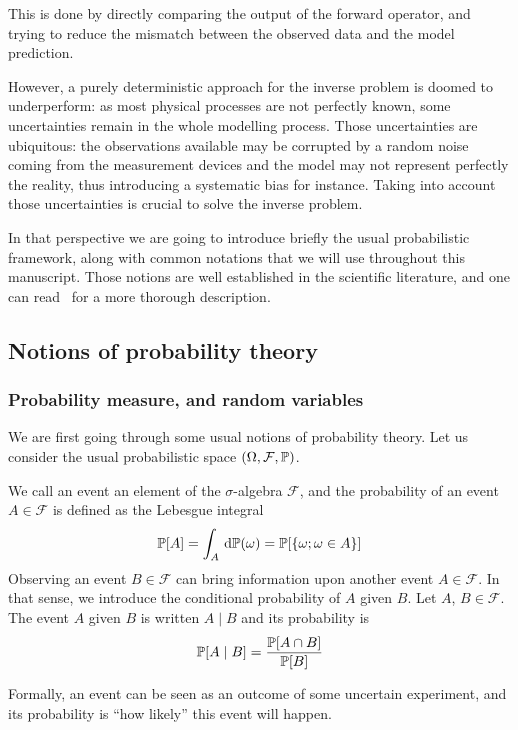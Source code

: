 \documentclass[../../Main_ManuscritThese.tex]{subfiles}
\begin{document}
This is done by directly comparing the output of the forward operator, and trying to reduce the mismatch between the observed data and the model prediction.



However, a purely deterministic approach for the inverse problem is doomed to underperform: as most physical processes are not perfectly known, some uncertainties remain in the whole modelling process. Those uncertainties are ubiquitous: the observations available may be corrupted by a random noise coming from the measurement devices and the model may not represent perfectly the reality, thus introducing a systematic bias for instance. Taking into account those uncertainties is crucial to solve the inverse problem.



In that perspective we are going to introduce briefly the usual probabilistic framework, along with common notations that we will use throughout this manuscript. Those notions are well established in the scientific literature, and one can read~\cite{billingsley_probability_2008} for a more thorough description.




\subsection{Notions of probability theory}
\subsubsection{Probability measure, and random variables}
\label{sec:notion_prob_theory}

We are first going through some usual notions of probability theory. 
Let us consider the usual probabilistic space $(\Omega, \mathcal{F}, \mathbb{P})$.
\begin{definition}
  \label{def:prob_event}
   We call an event an element of the $\sigma$-algebra $\mathcal{F}$, and the probability of an event $A\in \mathcal{F}$ is defined as the Lebesgue integral
  \begin{equation}
    \mathbb{P}[A] = \int_{A} \,\mathrm{d}\mathbb{P}(\omega) = \mathbb{P}[\{\omega ; \omega \in A\}]
  \end{equation}
Observing an event $B \in \mathcal{F}$ can bring information upon another event $A\in \mathcal{F}$. In that sense, we introduce the conditional probability of $A$ given $B$.
\label{def:cond_proba}
  Let $A$, $B \in \mathcal{F}$.
  The event $A$ given $B$ is written $A \mid B$ and its probability is
  \begin{equation}
    \mathbb{P}[A \mid B] = \frac{\mathbb{P}[A \cap B]}{\mathbb{P}[B]}
  \end{equation}
\end{definition}
Formally, an event can be seen as an outcome of some uncertain experiment, and its probability is ``how likely'' this event will happen.
\end{document}

